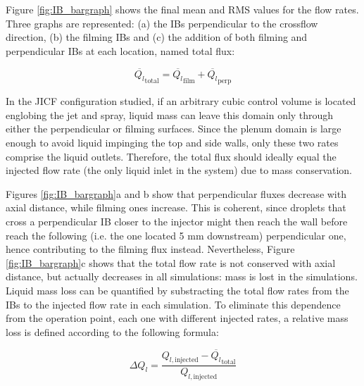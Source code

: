 \clearpage

Figure \ref{fig:IB_bargraph} shows the final mean and RMS values for the flow rates. Three graphs are represented: (a) the IBs perpendicular to the crossflow direction, (b) the filming IBs and (c) the addition of both filming and perpendicular IBs at each location, named total flux:

\begin{equation}
\overline{Q_l}_{\mathrm{total}} = \overline{Q_l}_{\mathrm{film}} + \overline{Q_l}_{\mathrm{perp}}
\end{equation}

In the JICF configuration studied, if an arbitrary cubic control volume is located englobing the jet and spray, liquid mass can leave this domain only through either the perpendicular or filming surfaces. Since the plenum domain is large enough to avoid liquid impinging the top and side walls, only these two rates comprise the liquid outlets. Therefore, the total flux should ideally equal the injected flow rate (the only liquid inlet in the system) due to mass conservation. 

Figures \ref{fig:IB_bargraph}a and b show that perpendicular fluxes decrease with axial distance, while filming ones increase. This is coherent, since droplets that cross a perpendicular IB closer to the injector might then reach the wall before reach the following (i.e. the one located 5 mm downstream) perpendicular one, hence contributing to the filming flux instead. Nevertheless, Figure \ref{fig:IB_bargraph}c shows that the total flow rate is not conserved with axial distance, but actually decreases in all simulations: mass is lost in the simulations. Liquid mass loss can be quantified by substracting the total flow rates from the IBs to the injected flow rate in each simulation. To eliminate this dependence from the operation point, each one with different injected rates, a relative mass loss is defined according to the following formula:

\begin{equation}
\Delta Q_l = \frac{Q_{l,\mathrm{injected}} - \overline{Q_l}_{\mathrm{total}}}{Q_{l,\mathrm{injected}}}
\end{equation}




